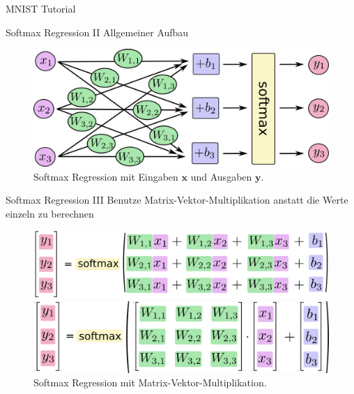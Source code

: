 \documentclass[utf8, smaller, c]{beamer}
\begin{document}
\begin{frame}{MNIST Tutorial}
	\framebreak
	
	\begin{block}{Softmax Regression II}
		Allgemeiner Aufbau
		\begin{figure}[c]
			\includegraphics[scale=0.08]{pics/softmax_regression_scalargraph}
			\caption{Softmax Regression mit Eingaben $\mathbf{x}$ und Ausgaben $\mathbf{y}$.}
		\end{figure}
	\end{block}
	
	\framebreak
	
	\begin{block}{Softmax Regression III}
		Benutze Matrix-Vektor-Multiplikation anstatt die Werte einzeln zu berechnen
		\vspace{2pt}
		\begin{figure}[c]
			\includegraphics[scale=0.042]{pics/softmax_regression_scalarequation}
			\caption{Softmax Regression mit Skalaren.}
			\includegraphics[scale=0.042]{pics/softmax_regression_vectorequation}
			\caption{Softmax Regression mit Matrix-Vektor-Multiplikation.}	
		\end{figure}			
	\end{block}
	
	\framebreak
	

\end{frame}
\end{document}
